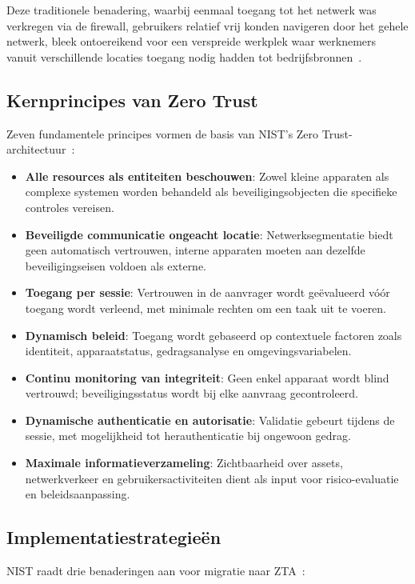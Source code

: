\vspace{2ex}

Deze traditionele benadering, waarbij eenmaal toegang tot het netwerk was verkregen via de firewall, gebruikers relatief vrij konden navigeren door het gehele netwerk, bleek ontoereikend voor een verspreide werkplek waar werknemers vanuit verschillende locaties toegang nodig hadden tot bedrijfsbronnen~\autocite{Deshpande-2021}.

\subsection{Kernprincipes van Zero Trust}
\label{sec:Kernprincipes van Zero Trust}
Zeven fundamentele principes vormen de basis van NIST’s Zero Trust-architectuur~\autocite{NIST2020}:  

\begin{itemize}
  \item \textbf{Alle resources als entiteiten beschouwen}: Zowel kleine apparaten als complexe systemen worden behandeld als beveiligingsobjecten die specifieke controles vereisen.  
  \item \textbf{Beveiligde communicatie ongeacht locatie}: Netwerksegmentatie biedt geen automatisch vertrouwen, interne apparaten moeten aan dezelfde beveiligingseisen voldoen als externe.  
  \item \textbf{Toegang per sessie}: Vertrouwen in de aanvrager wordt geëvalueerd vóór toegang wordt verleend, met minimale rechten om een taak uit te voeren.  
  \item \textbf{Dynamisch beleid}: Toegang wordt gebaseerd op contextuele factoren zoals identiteit, apparaatstatus, gedragsanalyse en omgevingsvariabelen.  
  \item \textbf{Continu monitoring van integriteit}: Geen enkel apparaat wordt blind vertrouwd; beveiligingsstatus wordt bij elke aanvraag gecontroleerd.  
  \item \textbf{Dynamische authenticatie en autorisatie}: Validatie gebeurt tijdens de sessie, met mogelijkheid tot herauthenticatie bij ongewoon gedrag.  
  \item \textbf{Maximale informatieverzameling}: Zichtbaarheid over assets, netwerkverkeer en gebruikersactiviteiten dient als input voor risico-evaluatie en beleidsaanpassing.  
\end{itemize}

\subsection{Implementatiestrategieën}
NIST raadt drie benaderingen aan voor migratie naar ZTA~\autocite{NIST2020}:

